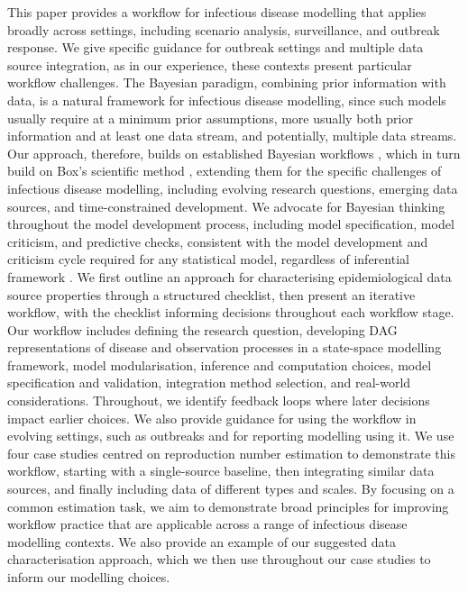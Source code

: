 \documentclass{article}
\begin{document}
This paper provides a workflow for infectious disease modelling that applies broadly across settings, including scenario analysis, surveillance, and outbreak response. We give specific guidance for outbreak settings and multiple data source integration, as in our experience, these contexts present particular workflow challenges.
The Bayesian paradigm, combining prior information with data, is a natural framework for infectious disease modelling, since such models usually require at a minimum prior assumptions, more usually both prior information and at least one data stream, and potentially, multiple data streams. Our approach, therefore, builds on established Bayesian workflows \citep{green2003highly,gelman2020bayesian}, which in turn build on Box's scientific method \citep{box1979robustness,Box1980}, extending them for the specific challenges of infectious disease modelling, including evolving research questions, emerging data sources, and time-constrained development.
We advocate for Bayesian thinking throughout the model development process, including model specification, model criticism, and predictive checks, consistent with the model development and criticism cycle required for any statistical model, regardless of inferential framework \citep{box1979robustness}.
We first outline an approach for characterising epidemiological data source properties through a structured checklist, then present an iterative workflow, with the checklist informing decisions throughout each workflow stage.
Our workflow includes defining the research question, developing \ac{DAG} representations of disease and observation processes in a state-space modelling framework, model modularisation, inference and computation choices, model specification and validation, integration method selection, and real-world considerations.
Throughout, we identify feedback loops where later decisions impact earlier choices.
We also provide guidance for using the workflow in evolving settings, such as outbreaks and for reporting modelling using it.
We use four case studies centred on reproduction number estimation to demonstrate this workflow, starting with a single-source baseline, then integrating similar data sources, and finally including data of different types and scales.
By focusing on a common estimation task, we aim to demonstrate broad principles for improving workflow practice that are applicable across a range of infectious disease modelling contexts.
We also provide an example of our suggested data characterisation approach, which we then use throughout our case studies to inform our modelling choices.
\end{document}
